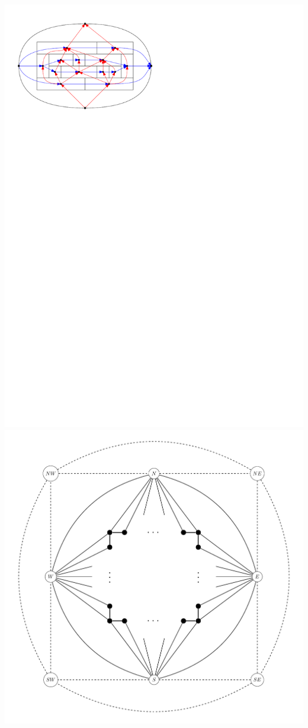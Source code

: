 \documentclass[a4paper]{article}
\begin{document}
\includegraphics[scale=1]{rectangularDuals/img/relSegmentFaceRescale}
\clearpage%
\includegraphics[scale=0.5]{fixExtension/img/scafold}
\end{document}
